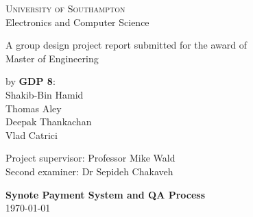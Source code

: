 \begin{titlepage}
    \begin{center}
        \vfill

        \large
        \textsc{University of Southampton}
        \\
        {Electronics and Computer Science}

        \vspace{3.0cm}

        \large
        {A group design project report submitted for the award of}\\
        {Master of Engineering}\\

        \vspace{3.0cm}

        by \textbf{GDP 8}:\\
        {Shakib-Bin Hamid}\\
        {Thomas Aley}\\
        {Deepak Thankachan}\\
        {Vlad Catrici}

        \vspace{3.0cm}

        \large
        Project supervisor: Professor Mike Wald\\
        Second examiner: Dr Sepideh Chakaveh\\

        \vspace{3.0cm}

        \textbf{Synote Payment System and QA Process}\\
        \today

        \vfill

    \end{center}
\end{titlepage}
